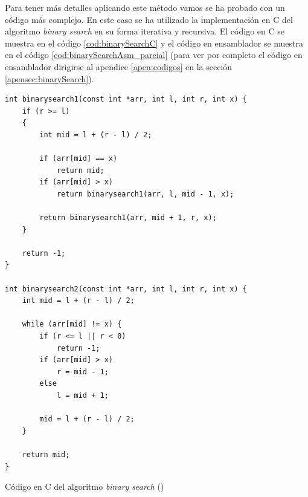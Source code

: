 Para tener más detalles aplicando este método vamos se ha probado con un código más complejo.
En este caso se ha utilizado la implementación en C del algoritmo \textit{binary search} en
su forma iterativa y recursiva. El código en C se muestra en el código \ref{cod:binarySearchC}
y el código en ensamblador se muestra en el código \ref{cod:binarySearchAsm_parcial} (para ver
por completo el código en ensamblador dirigirse al apendice \ref{apen:codigos} en la sección
\ref{apensec:binarySearch}).

\begin{mycode}
    \begin{verbatim}
int binarysearch1(const int *arr, int l, int r, int x) {
    if (r >= l)
    {
        int mid = l + (r - l) / 2;

        if (arr[mid] == x)
            return mid;
        if (arr[mid] > x)
            return binarysearch1(arr, l, mid - 1, x);

        return binarysearch1(arr, mid + 1, r, x);
    }

    return -1;
}

int binarysearch2(const int *arr, int l, int r, int x) {
    int mid = l + (r - l) / 2;

    while (arr[mid] != x) {
        if (r <= l || r < 0)
            return -1;
        if (arr[mid] > x)
            r = mid - 1;
        else
            l = mid + 1;

        mid = l + (r - l) / 2;
    }

    return mid;
}
    \end{verbatim}
    \caption[Código en C del algoritmo \textit{binary search}]{Código en C del algoritmo \textit{binary search} (\cite{BinarySearchGitHub})}
    \label{cod:binarySearchC}
\end{mycode}

